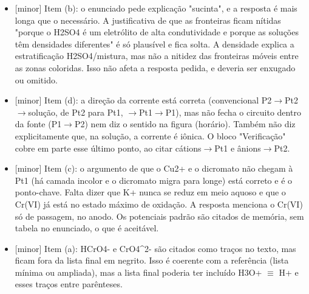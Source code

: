 \documentclass{article}%
\begin{document}
\begin{itemize}%
\item%
{[}minor{]} Item (b): o enunciado pede explicação "sucinta", e a resposta é mais longa que o necessário. A justificativa de que as fronteiras ficam nítidas "porque o H2SO4 é um eletrólito de alta condutividade e porque as soluções têm densidades diferentes" é só plausível e fica solta. A densidade explica a estratificação H2SO4/mistura, mas não a nitidez das fronteiras móveis entre as zonas coloridas. Isso não afeta a resposta pedida, e deveria ser enxugado ou omitido.%
\item%
{[}minor{]} Item (d): a direção da corrente está correta (convencional P2$\to$Pt2$\to$solução, de Pt2 para Pt1, $\to$Pt1$\to$P1), mas não fecha o circuito dentro da fonte (P1$\to$P2) nem diz o sentido na figura (horário). Também não diz explicitamente que, na solução, a corrente é iônica. O bloco "Verificação" cobre em parte esse último ponto, ao citar cátions$\to$Pt1 e ânions$\to$Pt2.%
\item%
{[}minor{]} Item (c): o argumento de que o Cu2+ e o dicromato não chegam à Pt1 (há camada incolor e o dicromato migra para longe) está correto e é o ponto{-}chave. Falta dizer que K+ nunca se reduz em meio aquoso e que o Cr(VI) já está no estado máximo de oxidação. A resposta menciona o Cr(VI) só de passagem, no anodo. Os potenciais padrão são citados de memória, sem tabela no enunciado, o que é aceitável.%
\item%
{[}minor{]} Item (a): HCrO4{-} e CrO4\^{}2{-} são citados como traços no texto, mas ficam fora da lista final em negrito. Isso é coerente com a referência (lista mínima ou ampliada), mas a lista final poderia ter incluído H3O+ $\equiv$ H+ e esses traços entre parênteses.%
\end{itemize}%
\end{document}
